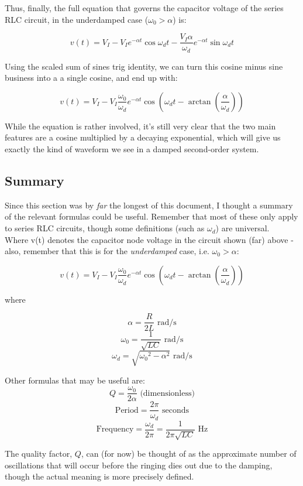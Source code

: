 \documentclass[12pt,a4paper]{report}
\begin{document}
Thus, finally, the full equation that governs the capacitor voltage of the series RLC circuit, in the underdamped case ($\omega_0 > \alpha$) is:

\[ v(t) = V_I - V_I e^{-\alpha t} \cos{\omega_d t} - \frac{V_I \alpha}{\omega_d} e^{-\alpha t} \sin{\omega_d t} \]

Using the scaled sum of sines trig identity, we can turn this cosine minus sine business into a a single cosine, and end up with:

\[ v(t) = V_I - V_I \frac{\omega_0}{\omega_d} e^{-\alpha t} \cos{(\omega_d t - \arctan{(\frac{\alpha}{\omega_d})})} \]

While the equation is rather involved, it's still very clear that the two main features are a cosine multiplied by a decaying exponential, which will give us exactly the kind of waveform we see in a damped second-order system.

\subsection{Summary}
Since this section was by \emph{far} the longest of this document, I thought a summary of the relevant formulas could be useful. Remember that most of these only apply to series RLC circuits, though some definitions (such as $\omega_d$) are universal.\\

Where v(t) denotes the capacitor node voltage in the circuit shown (far) above - also, remember that this is for the \emph{underdamped} case, i.e. $\displaystyle \omega_0 > \alpha$:

\[ v(t) = V_I - V_I \frac{\omega_0}{\omega_d} e^{-\alpha t} \cos{(\omega_d t - \arctan{(\frac{\alpha}{\omega_d})})} \]

where

\[ \alpha = \frac{R}{2L} \text{ rad/s}\]
\[ \omega_0 = \frac{1}{\sqrt{LC}} \text{ rad/s} \]
\[ \omega_d = \sqrt{{\omega_0}^2 - \alpha^2} \text{ rad/s} \]

Other formulas that may be useful are:
\[ Q = \frac{\omega_0}{2\alpha} \text{ (dimensionless)} \]
\[ \text{Period} = \frac{2\pi}{\omega_d} \text{ seconds} \]
\[ \text{Frequency} = \frac{\omega_d}{2\pi} = \frac{1}{2\pi \sqrt{LC}} \text{ Hz} \]

The quality factor, $Q$, can (for now) be thought of as the approximate number of oscillations that will occur before the ringing dies out due to the damping, though the actual meaning is more precisely defined.
\end{document}
